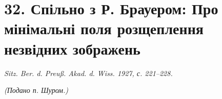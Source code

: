 \documentclass[11pt]{article}
\begin{document}

\setcounter{footnote}{0}

\section*{32. Спільно з Р. Брауером: Про мінімальні поля розщеплення незвідних зображень}
\begin{center}
\emph{Sitz. Ber. d. Preuß. Akad. d. Wiss. 1927, с. 221--228.}
\end{center}

\begin{center}\emph{(Подано п. Шуром.)}\end{center}
\end{document}
